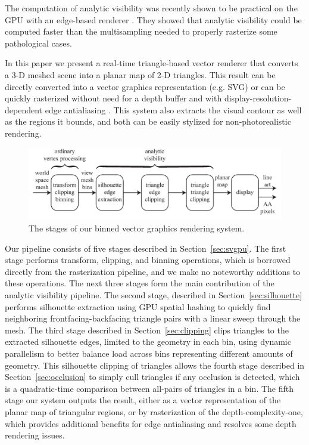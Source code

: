 \documentclass[review]{acmsiggraph}
\begin{document}
The computation of analytic visibility was recently shown to be practical on
the GPU with an edge-based renderer \cite{auzinger2013}. They
showed that analytic visibility could be computed faster than the
multisampling needed to properly rasterize some pathological cases.

In this paper we present a real-time triangle-based vector renderer that
converts a 3-D meshed scene into a planar map of 2-D triangles. This result can
be directly converted into a vector graphics representation (e.g. SVG)
or can be quickly rasterized without need for a depth buffer and with
display-resolution-dependent edge antialiasing \cite{reshetov2009,jimenez2012}.
This system also extracts the visual contour as well as the regions it bounds,
and both can be easily stylized for non-photorealistic rendering.

\begin{figure}
\includegraphics{images/pipeline.pdf}
\caption{The stages of our binned vector graphics rendering system.}
\label{fig:pipeline}
\end{figure}

Our pipeline consists of five stages described in Section~\ref{sec:svgpu}. The
first stage performs transform,
clipping, and binning operations, which is borrowed directly from the
rasterization pipeline, and we make no noteworthy additions to these
operations. The next three stages form the main contribution of the analytic
visibility pipeline. The second stage, described in
Section~\ref{sec:silhouette} performs silhouette extraction using GPU
spatial hashing to quickly find neighboring frontfacing-backfacing triangle
pairs with a linear sweep through the mesh. The third stage described in
Section~\ref{sec:clipping} clips triangles to
the extracted silhouette edges, limited to the geometry in each bin, using
dynamic parallelism to better balance load across bins representing
different amounts of geometry. This silhouette clipping of triangles allows
the fourth stage described in Section~\ref{sec:occlusion} to simply cull
triangles if any occlusion is detected, which
is a quadratic-time comparison between all-pairs of triangles in a bin.
The fifth stage our system outputs the result, either as a vector
representation of the planar map of triangular regions, or by rasterization of
the depth-complexity-one, which provides additional benefits for edge
antialiasing and resolves some depth rendering issues.
\end{document}
